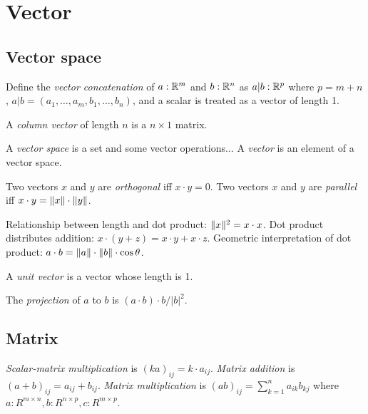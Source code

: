 \chapter{Vector}

\section{Vector space}

%
%
%
Define the \emph{vector concatenation} of \(a : \mathbb{R}^m\) and \(b : \mathbb{R}^n\)
as \(a|b : \mathbb{R}^p\)
where \(p = m + n\),
\(a|b = (a_1 , \ldots , a_m , b_1 , \ldots , b_n)\),
and a scalar is treated as a vector of length 1.

%
%
A \emph{column vector} of length \(n\) is a \(n \times 1\) matrix.

%
%
A \emph{vector space} is a set and some vector operations...
%
A \emph{vector} is an element of a vector space.

%
%
Two vectors \(x\) and \(y\) are \emph{orthogonal} iff \(x \cdot y = 0\).
%
%
Two vectors \(x\) and \(y\) are \emph{parallel} iff \(x \cdot y = \lVert x\rVert \cdot \lVert y\rVert\).

%
%
Relationship between length and dot product: \(\lVert x\rVert^2 = x \cdot x\).
Dot product distributes addition: \(x \cdot (y+z) = x \cdot y + x \cdot z\).
Geometric interpretation of dot product: \(a \cdot b = \lVert a\rVert \cdot \lVert b\rVert \cdot \cos \theta\).

%
%
A \emph{unit vector} is a vector whose length is 1.

%
%
%
The \emph{projection} of \(a\) to \(b\) is \((a \cdot b) \cdot b / |b|^2\).

\section{Matrix}

%
\emph{Scalar-matrix multiplication} is \((ka)_{ij} = k \cdot a_{ij}\).
%
%
\emph{Matrix addition} is \((a + b)_{ij} = a_{ij} + b_{ij}\).
%
%
\emph{Matrix multiplication} is \((ab)_{ij} = \sum_{k=1}^n a_{ik} b_{kj}\) where
\(a : R^{m \times n}, b : R^{n \times p}, c : R^{m \times p}\).

